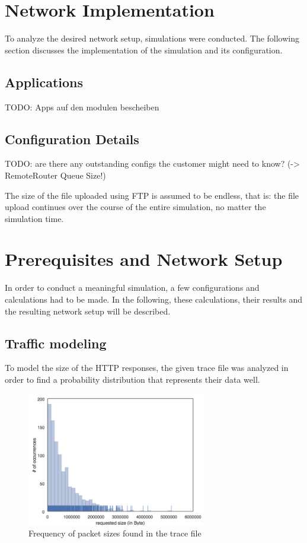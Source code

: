 \documentclass[
10pt, %
a4paper, %
oneside, %
headinclude,footinclude, %
BCOR5mm, %
]{scrartcl}
\begin{document}
\section{Network Implementation}
To analyze the desired network setup, simulations were conducted. The following section discusses the implementation of the simulation and its configuration.


\subsection{Applications}
TODO: Apps auf den modulen bescheiben

\subsection{Configuration Details}

TODO: are there any outstanding configs the customer might need to know? (-> RemoteRouter Queue Size!)

The size of the file uploaded using FTP is assumed to be endless, that is: the file upload continues over the course of the entire simulation, no matter the simulation time.


\section{Prerequisites and Network Setup}

In order to conduct a meaningful simulation, a few configurations and calculations had to be made. In the following, these calculations, their results and the resulting network setup will be described.

\subsection{Traffic modeling}

To model the size of the HTTP responses, the given trace file was analyzed in order to find a probability distribution that represents their data well.

\begin{figure}[!ht]
  \centering
  \includegraphics[width=0.7\textwidth]{Figures/trace_plot.png}
  \caption{Frequency of packet sizes found in the trace file} \label{fig:first_plot}
\end{figure}
\end{document}

